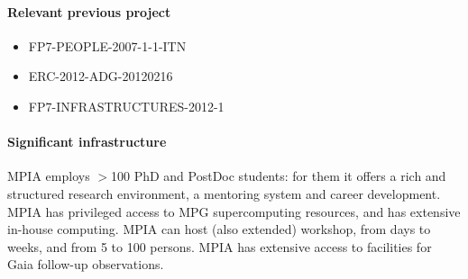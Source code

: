 \paragraph{Relevant previous project}
\begin{itemize}
    \item FP7-PEOPLE-2007-1-1-ITN
    \item ERC-2012-ADG-20120216
    \item FP7-INFRASTRUCTURES-2012-1
\end{itemize}

\paragraph{Significant infrastructure}
MPIA employs $>$100 PhD and PostDoc students: for them it offers 
a rich and structured research environment, a mentoring system
and career development. MPIA has privileged access to MPG supercomputing resources,
and has extensive in-house computing. MPIA can host (also extended) workshop, from days to weeks, and from 5 to 100 persons. 
MPIA has extensive access to facilities for Gaia follow-up observations.



